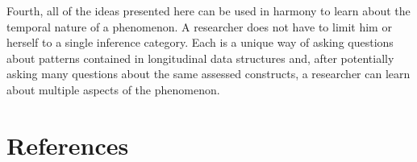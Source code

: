 \documentclass[english,,man]{apa6}
\begin{document}
Fourth, all of the ideas presented here can be used in harmony to learn about the temporal nature of a phenomenon. A researcher does not have to limit him or herself to a single inference category. Each is a unique way of asking questions about patterns contained in longitudinal data structures and, after potentially asking many questions about the same assessed constructs, a researcher can learn about multiple aspects of the phenomenon.

\newpage

\hypertarget{references}{%
\section{References}\label{references}}

\setlength{\parindent}{-0.5in}
\setlength{\leftskip}{0.5in}
\end{document}
